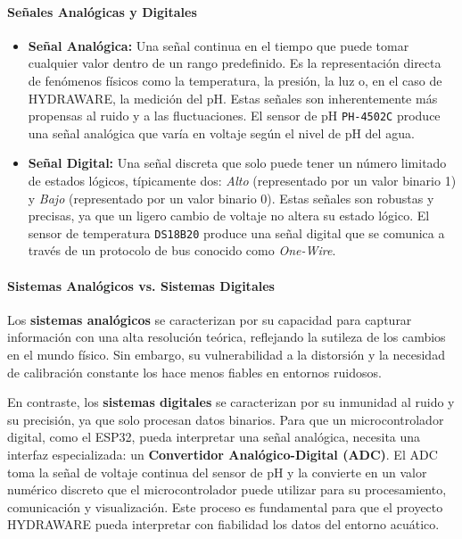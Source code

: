 \documentclass[a4paper,12pt]{article}
\begin{document}
	\paragraph{Señales Analógicas y Digitales}
	\begin{itemize}
		\item \textbf{Señal Analógica:} Una señal continua en el tiempo que puede tomar cualquier valor dentro de un rango predefinido. Es la representación directa de fenómenos físicos como la temperatura, la presión, la luz o, en el caso de HYDRAWARE, la medición del pH. Estas señales son inherentemente más propensas al ruido y a las fluctuaciones. El sensor de pH \texttt{PH-4502C} produce una señal analógica que varía en voltaje según el nivel de pH del agua.
		
		\item \textbf{Señal Digital:} Una señal discreta que solo puede tener un número limitado de estados lógicos, típicamente dos: \textit{Alto} (representado por un valor binario 1) y \textit{Bajo} (representado por un valor binario 0). Estas señales son robustas y precisas, ya que un ligero cambio de voltaje no altera su estado lógico. El sensor de temperatura \texttt{DS18B20} produce una señal digital que se comunica a través de un protocolo de bus conocido como \textit{One-Wire}.
	\end{itemize}
	
	\paragraph{Sistemas Analógicos vs. Sistemas Digitales} \hfill\break
	
	Los \textbf{sistemas analógicos} se caracterizan por su capacidad para capturar información con una alta resolución teórica, reflejando la sutileza de los cambios en el mundo físico. Sin embargo, su vulnerabilidad a la distorsión y la necesidad de calibración constante los hace menos fiables en entornos ruidosos.
	
	En contraste, los \textbf{sistemas digitales} se caracterizan por su inmunidad al ruido y su precisión, ya que solo procesan datos binarios. Para que un microcontrolador digital, como el ESP32, pueda interpretar una señal analógica, necesita una interfaz especializada: un \textbf{Convertidor Analógico-Digital (ADC)}. El ADC toma la señal de voltaje continua del sensor de pH y la convierte en un valor numérico discreto que el microcontrolador puede utilizar para su procesamiento, comunicación y visualización. Este proceso es fundamental para que el proyecto HYDRAWARE pueda interpretar con fiabilidad los datos del entorno acuático.
	
\end{document}
